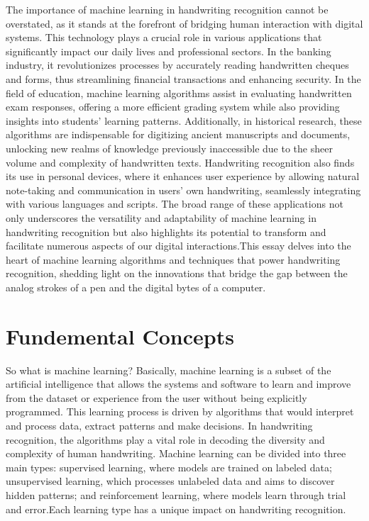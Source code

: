 \documentclass[12pt]{article}
\begin{document}
The importance of machine learning in handwriting recognition cannot be overstated, as it stands at the forefront of bridging human interaction with digital systems. This technology plays a crucial role in various applications that significantly impact our daily lives and professional sectors. In the banking industry, it revolutionizes processes by accurately reading handwritten cheques and forms, thus streamlining financial transactions and enhancing security. In the field of education, machine learning algorithms assist in evaluating handwritten exam responses, offering a more efficient grading system while also providing insights into students' learning patterns. Additionally, in historical research, these algorithms are indispensable for digitizing ancient manuscripts and documents, unlocking new realms of knowledge previously inaccessible due to the sheer volume and complexity of handwritten texts. Handwriting recognition also finds its use in personal devices, where it enhances user experience by allowing natural note-taking and communication in users' own handwriting, seamlessly integrating with various languages and scripts. The broad range of these applications not only underscores the versatility and adaptability of machine learning in handwriting recognition but also highlights its potential to transform and facilitate numerous aspects of our digital interactions.This essay delves into the heart of machine learning algorithms and techniques that power handwriting recognition, shedding light on the innovations that bridge the gap between the analog strokes of a pen and the digital bytes of a computer.

\section* {Fundemental Concepts}
So what is machine learning? Basically, machine learning is a subset of the artificial intelligence that allows the systems and software to learn and improve from the dataset or experience from the user without being explicitly programmed. This learning process is driven by algorithms that would interpret and process data, extract patterns and make decisions. In handwriting recognition, the algorithms play a vital role in decoding the diversity and complexity of human handwriting. Machine learning can be divided into three main types: supervised learning, where models are trained on labeled data; unsupervised learning, which processes unlabeled data and aims to discover hidden patterns; and reinforcement learning, where models learn through trial and error.Each learning type has a unique impact on handwriting recognition.
\end{document}

